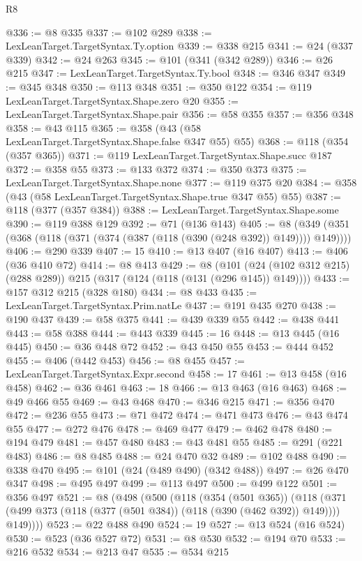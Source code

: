 \begin{lexlean}{R8}
\begin{coremodule}
@336 := @8 @335
@337 := @102 @289
@338 := LexLeanTarget.TargetSyntax.Ty.option
@339 := @338 @215
@341 := @24 (@337 @339)
@342 := @24 @263
@345 := @101 (@341 (@342 @289))
@346 := @26 @215
@347 := LexLeanTarget.TargetSyntax.Ty.bool
@348 := @346 @347
@349 := @345 @348
@350 := @113 @348
@351 := @350 @122
@354 := @119 LexLeanTarget.TargetSyntax.Shape.zero @20
@355 := LexLeanTarget.TargetSyntax.Shape.pair
@356 := @58 @355
@357 := @356 @348
@358 := @43 @115
@365 := @358 (@43 (@58 LexLeanTarget.TargetSyntax.Shape.false @347 @55) @55)
@368 := @118 (@354 (@357 @365))
@371 := @119 LexLeanTarget.TargetSyntax.Shape.succ @187
@372 := @358 @55
@373 := @133 @372
@374 := @350 @373
@375 := LexLeanTarget.TargetSyntax.Shape.none
@377 := @119 @375 @20
@384 := @358 (@43 (@58 LexLeanTarget.TargetSyntax.Shape.true @347 @55) @55)
@387 := @118 (@377 (@357 @384))
@388 := LexLeanTarget.TargetSyntax.Shape.some
@390 := @119 @388 @129
@392 := @71 (@136 @143)
@405 := @8 (@349 (@351 (@368 (@118 (@371 (@374 (@387 (@118 (@390 (@248 @392)) @149)))) @149))))
@406 := @290 @339
@407 := 15
@410 := @13 @407 (@16 @407)
@413 := @406 (@36 @410 @72)
@414 := @8 @413
@429 := @8
    (@101 (@24 (@102 @312 @215) (@288 @289)) @215 (@317 (@124 (@118 (@131 (@296 @145)) @149))))
@433 := @157 @312 @215 (@328 @180)
@434 := @8 @433
@435 := LexLeanTarget.TargetSyntax.Prim.natLe
@437 := @191 @435 @270
@438 := @190 @437
@439 := @58 @375
@441 := @439 @339 @55
@442 := @438 @441
@443 := @58 @388
@444 := @443 @339
@445 := 16
@448 := @13 @445 (@16 @445)
@450 := @36 @448 @72
@452 := @43 @450 @55
@453 := @444 @452
@455 := @406 (@442 @453)
@456 := @8 @455
@457 := LexLeanTarget.TargetSyntax.Expr.second
@458 := 17
@461 := @13 @458 (@16 @458)
@462 := @36 @461
@463 := 18
@466 := @13 @463 (@16 @463)
@468 := @49 @466 @55
@469 := @43 @468
@470 := @346 @215
@471 := @356 @470
@472 := @236 @55
@473 := @71 @472
@474 := @471 @473
@476 := @43 @474 @55
@477 := @272 @476
@478 := @469 @477
@479 := @462 @478
@480 := @194 @479
@481 := @457 @480
@483 := @43 @481 @55
@485 := @291 (@221 @483)
@486 := @8 @485
@488 := @24 @470 @32
@489 := @102 @488
@490 := @338 @470
@495 := @101 (@24 (@489 @490) (@342 @488))
@497 := @26 @470 @347
@498 := @495 @497
@499 := @113 @497
@500 := @499 @122
@501 := @356 @497
@521 := @8
    (@498
      (@500
        (@118
          (@354 (@501 @365))
          (@118 (@371 (@499 @373 (@118 (@377 (@501 @384)) (@118 (@390 (@462 @392)) @149)))) @149))))
@523 := @22 @488 @490
@524 := 19
@527 := @13 @524 (@16 @524)
@530 := @523 (@36 @527 @72)
@531 := @8 @530
@532 := @194 @70
@533 := @216 @532
@534 := @213 @47
@535 := @534 @215

\end{coremodule}
\end{lexlean}

